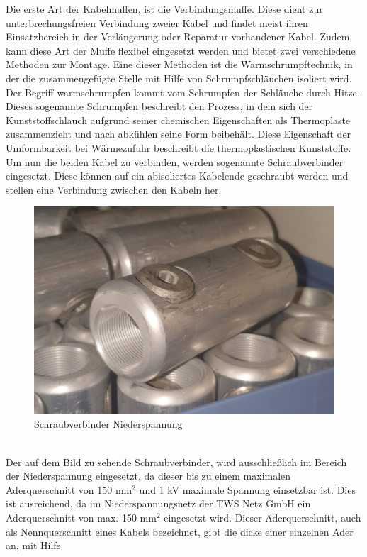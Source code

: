 Die erste Art der Kabelmuffen, ist die Verbindungsmuffe. Diese dient zur unterbrechungsfreien Verbindung zweier Kabel und findet meist ihren Einsatzbereich 
in der Verlängerung oder Reparatur vorhandener Kabel. Zudem kann diese Art der Muffe flexibel eingesetzt werden und bietet zwei verschiedene Methoden zur 
Montage. Eine dieser Methoden ist die Warmschrumpftechnik, in der die zusammengefügte Stelle mit Hilfe von Schrumpfschläuchen isoliert wird. Der Begriff 
warmschrumpfen kommt vom Schrumpfen der Schläuche durch Hitze. Dieses sogenannte Schrumpfen beschreibt den Prozess, in dem sich der Kunststoffschlauch 
aufgrund seiner chemischen Eigenschaften als Thermoplaste zusammenzieht und nach abkühlen seine Form beibehält. Diese Eigenschaft der Umformbarkeit bei 
Wärmezufuhr beschreibt die thermoplastischen Kunststoffe. Um nun die beiden Kabel zu verbinden, werden sogenannte Schraubverbinder eingesetzt. Diese können 
auf ein abisoliertes Kabelende geschraubt werden und stellen eine Verbindung zwischen den Kabeln her.
\begin{figure}[hbt]
\centering
\includegraphics[width=0.98\linewidth]{images/Schraubverbinder}
\caption[Schraubverbinder]{Schraubverbinder Niederspannung}
\label{fig:Schraubverbinder}
\end{figure}
\\
Der auf dem Bild zu sehende Schraubverbinder, wird ausschließlich im Bereich der Niederspannung eingesetzt, da dieser bis zu einem maximalen Aderquerschnitt 
von 150 $\text{mm}^2$ und 1 kV maximale Spannung einsetzbar ist. Dies ist ausreichend, da im Niederspannungsnetz der TWS Netz GmbH ein Aderquerschnitt von 
max. 150 $\text{mm}^2$ eingesetzt wird. Dieser Aderquerschnitt, auch als Nennquerschnitt eines Kabels bezeichnet, gibt die dicke einer einzelnen Ader an, mit Hilfe 
